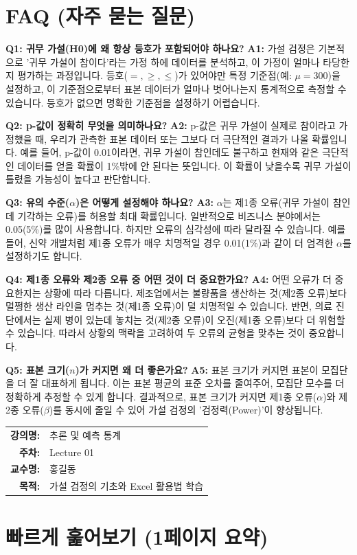 \documentclass[11pt,a4paper]{book}
\makeatletter
\theoremstyle{definition}
\newcommand{\metainfo}[4]{
\begin{tcolorbox}[
    colback=lightpurple,
    colframe=darkpurple,
    boxrule=1pt,
    arc=2mm,
    left=10pt,
    right=10pt,
    top=8pt,
    bottom=8pt
]
\begin{tabular}{@{}rl@{}}
\textbf{강의명:} & #1 \\[0.3em]
\textbf{주차:} & #2 \\[0.3em]
\textbf{교수명:} & #3 \\[0.3em]
\textbf{목적:} & \begin{minipage}[t]{0.75\textwidth}#4\end{minipage}
\end{tabular}
\end{tcolorbox}
}
\makeatother
\begin{document}
\section*{FAQ (자주 묻는 질문)}

\textbf{Q1: 귀무 가설(H0)에 왜 항상 등호가 포함되어야 하나요?}
\textbf{A1:} 가설 검정은 기본적으로 '귀무 가설이 참이다'라는 가정 하에 데이터를 분석하고, 이 가정이 얼마나 타당한지 평가하는 과정입니다. 등호($=, \ge, \le$)가 있어야만 특정 기준점(예: $\mu=300$)을 설정하고, 이 기준점으로부터 표본 데이터가 얼마나 벗어나는지 통계적으로 측정할 수 있습니다. 등호가 없으면 명확한 기준점을 설정하기 어렵습니다.

\textbf{Q2: p-값이 정확히 무엇을 의미하나요?}
\textbf{A2:} p-값은 귀무 가설이 실제로 참이라고 가정했을 때, 우리가 관측한 표본 데이터 또는 그보다 더 극단적인 결과가 나올 확률입니다. 예를 들어, p-값이 0.01이라면, 귀무 가설이 참인데도 불구하고 현재와 같은 극단적인 데이터를 얻을 확률이 1\%밖에 안 된다는 뜻입니다. 이 확률이 낮을수록 귀무 가설이 틀렸을 가능성이 높다고 판단합니다.

\textbf{Q3: 유의 수준($\alpha$)은 어떻게 설정해야 하나요?}
\textbf{A3:} $\alpha$는 제1종 오류(귀무 가설이 참인데 기각하는 오류)를 허용할 최대 확률입니다. 일반적으로 비즈니스 분야에서는 0.05(5\%)를 많이 사용합니다. 하지만 오류의 심각성에 따라 달라질 수 있습니다. 예를 들어, 신약 개발처럼 제1종 오류가 매우 치명적일 경우 0.01(1\%)과 같이 더 엄격한 $\alpha$를 설정하기도 합니다.

\textbf{Q4: 제1종 오류와 제2종 오류 중 어떤 것이 더 중요한가요?}
\textbf{A4:} 어떤 오류가 더 중요한지는 상황에 따라 다릅니다. 제조업에서는 불량품을 생산하는 것(제2종 오류)보다 멀쩡한 생산 라인을 멈추는 것(제1종 오류)이 덜 치명적일 수 있습니다. 반면, 의료 진단에서는 실제 병이 있는데 놓치는 것(제2종 오류)이 오진(제1종 오류)보다 더 위험할 수 있습니다. 따라서 상황의 맥락을 고려하여 두 오류의 균형을 맞추는 것이 중요합니다.

\textbf{Q5: 표본 크기($n$)가 커지면 왜 더 좋은가요?}
\textbf{A5:} 표본 크기가 커지면 표본이 모집단을 더 잘 대표하게 됩니다. 이는 표본 평균의 표준 오차를 줄여주어, 모집단 모수를 더 정확하게 추정할 수 있게 합니다. 결과적으로, 표본 크기가 커지면 제1종 오류($\alpha$)와 제2종 오류($\beta$)를 동시에 줄일 수 있어 가설 검정의 '검정력(Power)'이 향상됩니다.


\metainfo{추론 및 예측 통계}{Lecture 01}{홍길동}{가설 검정의 기초와 Excel 활용법 학습}


\section*{빠르게 훑어보기 (1페이지 요약)}
\end{document}
